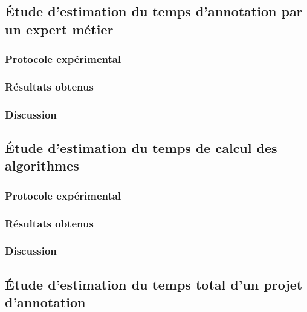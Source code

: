 		\subsection{Étude d'estimation du temps d'annotation par un expert métier}
		
			\subsubsection{Protocole expérimental}

			\subsubsection{Résultats obtenus}

			\subsubsection{Discussion}
		
		\subsection{Étude d'estimation du temps de calcul des algorithmes}
		
			\subsubsection{Protocole expérimental}

			\subsubsection{Résultats obtenus}

			\subsubsection{Discussion}
		
		\subsection{Étude d'estimation du temps total d'un projet d'annotation}
		

